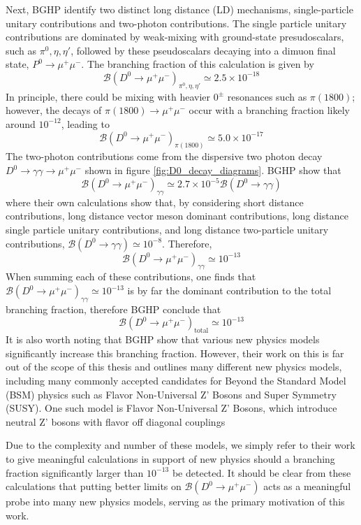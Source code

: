 Next, BGHP identify two distinct long distance (LD) mechanisms, single-particle unitary contributions and two-photon contributions. The single particle unitary contributions are dominated by weak-mixing with ground-state presudoscalars, such as $\pi^0, \eta, \eta'$, followed by these pseudoscalars decaying into a dimuon final state, $P^0 \to \mu^+ \mu^-$. The branching fraction of this calculation is given by
\begin{equation}
\mathcal{B}(D^0 \to \mu^+ \mu^-)_{\pi^0, \eta, \eta'} \simeq 2.5 \times 10^{-18}
\end{equation}
In principle, there could be mixing with heavier $0^\pm$ resonances such as $\pi(1800)$; however, the decays of $\pi(1800) \to \mu^+\mu^-$ occur with a branching fraction likely around $10^{-12}$, leading to
\begin{equation}
\mathcal{B}(D^0 \to \mu^+ \mu^-)_{\pi(1800)} \simeq  5.0 \times 10^{-17}
\end{equation}
The two-photon contributions come from the dispersive two photon decay $D^0 \to \gamma \gamma \to \mu^+ \mu^-$ shown in figure \ref{fig:D0_decay_diagrams}. BGHP show that 
\begin{equation}
\mathcal{B}(D^0 \to \mu^+ \mu^-)_{\gamma\gamma} \simeq 2.7 \times 10^{-5} \mathcal{B}(D^0 \to \gamma\gamma)
\end{equation}
where their own calculations show that, by considering short distance contributions, long distance vector meson dominant contributions, long distance single particle unitary contributions, and long distance two-particle unitary contributions, $\mathcal{B}(D^0 \to \gamma\gamma) \simeq 10^{-8}$. Therefore, 
\begin{equation}
\mathcal{B}(D^0 \to \mu^+ \mu^-)_{\gamma\gamma} \simeq 10^{-13}
\end{equation}
When summing each of these contributions, one finds that $\mathcal{B}(D^0 \to \mu^+ \mu^-)_{\gamma\gamma} \simeq 10^{-13}$ is by far the dominant contribution to the total branching fraction, therefore BGHP conclude that
\begin{equation}
\mathcal{B}(D^0 \to \mu^+ \mu^-)_{\text{total}} \simeq 10^{-13}
\end{equation}
It is also worth noting that BGHP show that various new physics models significantly increase this branching fraction. However, their work on this is far out of the scope of this thesis and outlines many different new physics models, including many commonly accepted candidates for Beyond the Standard Model (BSM) physics such as Flavor Non-Universal Z' Bosons and Super Symmetry (SUSY). One such model is Flavor Non-Universal Z' Bosons, which introduce neutral Z' bosons with flavor off diagonal couplings 

Due to the complexity and number of these models, we simply refer to their work to give meaningful calculations in support of new physics should a branching fraction significantly larger than $10^{-13}$ be detected. It should be clear from these calculations that putting better limits on $\mathcal{B}(D^0 \to \mu^+ \mu^-)$ acts as a meaningful probe into many new physics models, serving as the primary motivation of this work. 